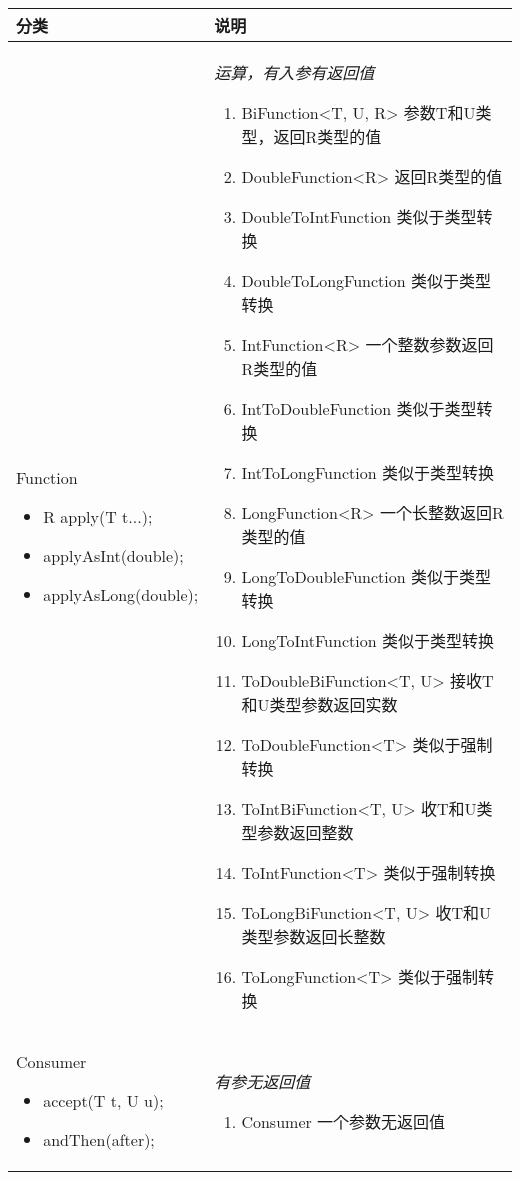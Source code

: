 \begin{longtable}{|p{4cm}|p{9cm}|}
	分类&说明\\
	\hline
	Function
	\begin{itemize}
		\small
		\setlength{\itemindent}{-1.2em}
		\setlength{\itemsep}{0pt}
		\item R apply(T t...);
		\item applyAsInt(double);
		\item applyAsLong(double);
	\end{itemize} & \emph{运算，有入参有返回值}
	\begin{enumerate}
		\setlength{\itemsep}{0pt}
		\small
		\item BiFunction<T, U, R> 参数T和U类型，返回R类型的值
		\item DoubleFunction<R> 返回R类型的值
		\item DoubleToIntFunction 类似于类型转换
		\item DoubleToLongFunction 类似于类型转换
		\item IntFunction<R> 一个整数参数返回R类型的值
		\item IntToDoubleFunction 类似于类型转换
		\item IntToLongFunction 类似于类型转换
		\item LongFunction<R> 一个长整数返回R类型的值
		\item LongToDoubleFunction 类似于类型转换
		\item LongToIntFunction 类似于类型转换
		\item ToDoubleBiFunction<T, U> 接收T和U类型参数返回实数
		\item ToDoubleFunction<T> 类似于强制转换
		\item ToIntBiFunction<T, U> 收T和U类型参数返回整数
		\item ToIntFunction<T> 类似于强制转换
		\item ToLongBiFunction<T, U> 收T和U类型参数返回长整数
		\item ToLongFunction<T> 类似于强制转换
	\end{enumerate} \\
	\hline
	Consumer
	\begin{itemize}
		\small
		\setlength{\itemindent}{-1.2em}
		\setlength{\itemsep}{0pt}
		\item accept(T t, U u);
		\item andThen(after);
	\end{itemize} &
	\emph{有参无返回值}
	\begin{enumerate}
		\setlength{\itemsep}{0pt}
		\small
		\item Consumer 一个参数无返回值

\end{enumerate}
\end{longtable}
